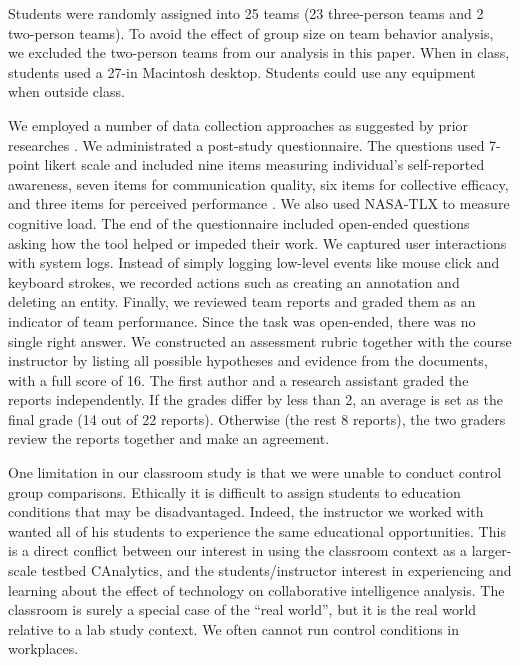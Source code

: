 Students were randomly assigned into 25 teams (23 three-person teams and 2
two-person teams). To avoid the effect of group size on team behavior analysis, we excluded the two-person teams from our analysis in this paper. When in class, students used a 27-in Macintosh desktop. Students could use any equipment when outside class.

We employed a number of data collection approaches as suggested by prior researches \cite{Convertino2011, Goyal2016}. We administrated a post-study
questionnaire. The questions used 7-point likert scale and included nine items measuring individual's
self-reported awareness, seven items for
communication quality, six items for collective efficacy, and three items for perceived performance \cite{Convertino2011}. We also used NASA-TLX \cite{Hart1988} to measure cognitive load. The end of the questionnaire
included open-ended questions asking how the tool helped or impeded their
work. We captured user interactions with system logs. Instead of simply logging
low-level events like mouse click and keyboard strokes, we recorded actions such
as creating an annotation and deleting an entity. Finally, we reviewed team
reports and graded them as an indicator of team performance. Since the task was
open-ended, there was no single right answer. We constructed an assessment
rubric together with the course instructor by listing all possible hypotheses
and evidence from the documents, with a full score of 16. The first author and a
research assistant graded the reports independently. If the grades differ by
less than 2, an average is set as the final grade (14 out of 22 reports).
Otherwise (the rest 8 reports), the two graders review the reports together and
make an agreement.

One limitation in our classroom study is that we were unable to conduct control group comparisons. Ethically it is difficult to assign students to education conditions that may be disadvantaged. Indeed, the instructor we worked with wanted all of his students to experience the same educational opportunities. This is a direct conflict between our interest in using the classroom context as a larger-scale testbed CAnalytics, and the students/instructor interest in experiencing and learning about the effect of technology on collaborative intelligence analysis. The classroom is surely a special case of the ``real world'', but it is the real world relative to a lab study context. We often cannot run control conditions in workplaces.
